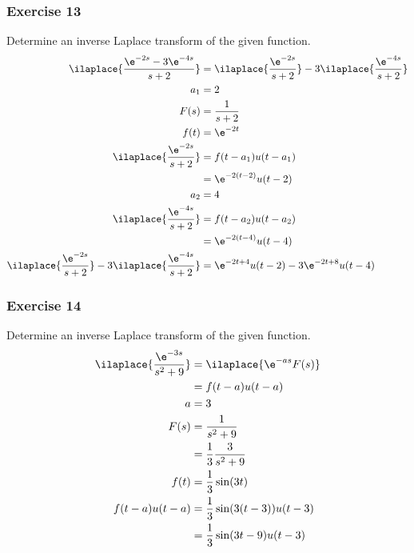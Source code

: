\documentclass{math}
\begin{document}
\subsubsection*{Exercise 13}
Determine an inverse Laplace transform of the given function.
\begin{align*}
  \ilaplace{\frac{\e^{-2s}-3\e^{-4s}}{s+2}} &=
    \ilaplace{\frac{\e^{-2s}}{s+2}}-3\ilaplace{\frac{\e^{-4s}}{s+2}} \\
  a_1 &= 2 \\
  F(s) &= \frac{1}{s+2} \\
  f(t) &= \e^{-2t} \\
  \ilaplace{\frac{\e^{-2s}}{s+2}} &= f(t-a_1)u(t-a_1) \\
  &= \e^{-2(t-2)}u(t-2) \\
  a_2 &= 4 \\
  \ilaplace{\frac{\e^{-4s}}{s+2}} &= f(t-a_2)u(t-a_2) \\
  &= \e^{-2(t-4)}u(t-4) \\
  \ilaplace{\frac{\e^{-2s}}{s+2}}-3\ilaplace{\frac{\e^{-4s}}{s+2}} &=
    \e^{-2t+4}u(t-2)-3\e^{-2t+8}u(t-4)
\end{align*}

\subsubsection*{Exercise 14}
Determine an inverse Laplace transform of the given function.
\begin{align*}
  \ilaplace{\frac{\e^{-3s}}{s^2+9}} &= \ilaplace{\e^{-as}F(s)} \\
  &= f(t-a)u(t-a) \\
  a &= 3 \\
  F(s) &= \frac{1}{s^2+9} \\
  &= \frac{1}{3}\frac{3}{s^2+9} \\
  f(t) &= \frac{1}{3}\sin(3t) \\
  f(t-a)u(t-a) &= \frac{1}{3}\sin(3(t-3))u(t-3) \\
  &= \frac{1}{3}\sin(3t-9)u(t-3)
\end{align*}
\end{document}
